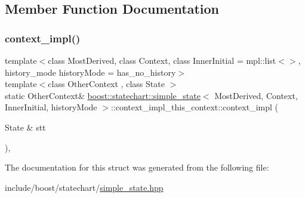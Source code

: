 \subsection{Member Function Documentation}
\mbox{\label{structboost_1_1statechart_1_1simple__state_1_1context__impl__this__context_a7d23c2a5945c1b8d1ede03bdb893e69a}} 
\subsubsection{\texorpdfstring{context\+\_\+impl()}{context\_impl()}}
{\footnotesize\ttfamily template$<$class Most\+Derived, class Context, class Inner\+Initial = mpl\+::list$<$$>$, history\+\_\+mode history\+Mode = has\+\_\+no\+\_\+history$>$ \\
template$<$class Other\+Context , class State $>$ \\
static Other\+Context\& \mbox{\hyperlink{classboost_1_1statechart_1_1simple__state}{boost\+::statechart\+::simple\+\_\+state}}$<$ Most\+Derived, Context, Inner\+Initial, history\+Mode $>$\+::context\+\_\+impl\+\_\+this\+\_\+context\+::context\+\_\+impl (\begin{DoxyParamCaption}\item[{State \&}]{stt }\end{DoxyParamCaption})\hspace{0.3cm}{\ttfamily [inline]}, {\ttfamily [static]}}



The documentation for this struct was generated from the following file\+:\begin{DoxyCompactItemize}
\item 
include/boost/statechart/\mbox{\hyperlink{simple__state_8hpp}{simple\+\_\+state.\+hpp}}\end{DoxyCompactItemize}
